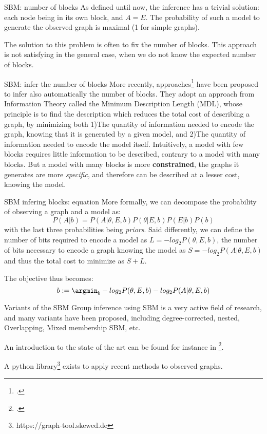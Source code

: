\begin{textbox}{SBM: number of blocks}
    As defined until now, the inference has a trivial solution: each node being in its own block, and $A=E$. The probability of such a model to generate the observed graph is maximal (1 for simple graphs).

    The solution to this problem is often to fix the number of blocks. This approach is not satisfying in the general case, when we do not know the expected number of blocks.
\end{textbox}


\begin{textbox}{SBM: infer the number of blocks}
    More recently, approaches\footcite{peixoto2019bayesian} have been proposed to infer also automatically the number of blocks. They adopt an approach from Information Theory called the Minimum Description Length (MDL), whose principle is to find the description which reduces the total cost of describing a graph, by minimizing both 1)The quantity of information needed to encode the graph, knowing that it is generated by a given model, and 2)The quantity of information needed to encode the model itself. Intuitively, a model with few blocks requires little information to be described, contrary to a model with many blocks. But a model with many blocks is more \textbf{constrained}, the graphs it generates are more \textit{specific}, and therefore can be described at a lesser cost, knowing the model.
\end{textbox}


\begin{textbox}{SBM infering blocks: equation}
    More formally, we can decompose the probability of observing a graph and a model as:
    \[
        P(A|b)= P(A|\theta, E, b) P(\theta|E, b) P(E|b)P (b)
    \]
    with the last three probabilities being \textit{priors}.  Said differently, we can define the number of bits required to encode a model as $L = -log_2 P(\theta,E,b)$, the number of bits necessary to encode a graph knowing the model as $S = -log_2 P(A|\theta,E,b)$ and thus the total cost to minimize as $S+L$.

    The objective thus becomes:
    \[
        b:=\argmin_{b} - log_2 P(\theta,E,b) - log_2 P(A|\theta,E,b)
    \]
\end{textbox}


\begin{textbox}{Variants of the SBM}
    Group inference using SBM is a very active field of research, and many variants have been proposed, including degree-corrected, nested, Overlapping, Mixed membership SBM, etc.

    An introduction to the state of the art can be found for instance in \footcite{lee2019review}.

    A python library\footnote{https://graph-tool.skewed.de} exists to apply recent methods to observed graphs.
\end{textbox}


